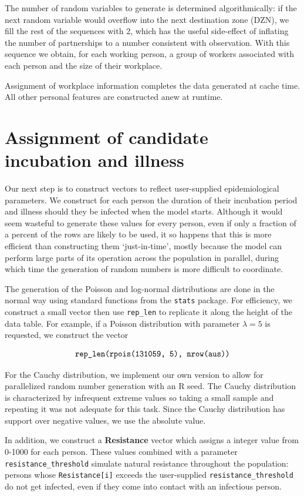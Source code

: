 \documentclass[submission]{grattan}
\newcommand*{\code}[1]{\texttt{#1}}
\newcommand*{\defi}[1]{\textbf{#1}}
\begin{document}
The number of random variables to generate is determined algorithmically: if the next random variable
would overflow into the next destination zone (DZN), we fill the rest of the sequences with 2, which has the useful
side-effect of inflating the number of partnerships to a number consistent with observation.
With this sequence we obtain, for each working person, a group of workers associated with each person
and the size of their workplace.

Assignment of workplace information completes the data generated at cache time. All other personal
features are constructed anew at runtime.

\section{Assignment of candidate incubation and illness }

Our next step is to construct vectors to reflect user-supplied epidemiological parameters.
We construct for each person the duration of their incubation period and illness should they
be infected when the model starts. Although it would seem wasteful to generate these values
for every person, even if only a fraction of a percent of the rows are likely to be used, it
so happens that this is more efficient than constructing them `just-in-time', mostly because
the model can perform large parts of its operation across the population in parallel, during
which time the generation of random numbers is more difficult to coordinate.

The generation of the Poisson and log-normal distributions are done in the normal way using
 standard functions from the \code{stats} package.  For efficiency, we construct a small vector
 then use \code{rep\_len} to replicate it along the height of the data table. For example, if
 a Poisson distribution with parameter \(\lambda = 5\) is requested, we construct the vector

\[\text{\code{rep\_len(rpois(131059, 5), nrow(aus))}} \]

 For the Cauchy distribution, we implement our own version to allow for parallelized random
 number generation with an R seed. The Cauchy distribution is characterized by infrequent
 extreme values so taking a small sample and repeating it was not adequate for this task.
 Since the Cauchy distribution has support over negative values,
 we use the absolute value.

 In addition, we construct a \defi{Resistance} vector which assigns a integer value from 0-1000
 for each person. These values combined with a parameter \code{resistance\_threshold} simulate
 natural resistance throughout the population: persons whose \code{Resistance[i]} exceeds
 the user-supplied \code{resistance\_threshold} do not get infected, even if they come into 
 contact with an infectious person. 
\end{document}
